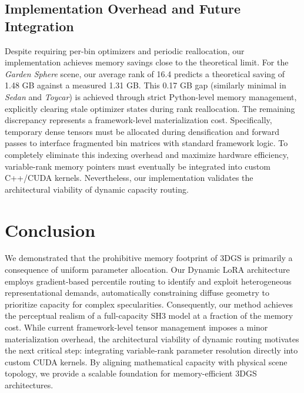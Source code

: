 \documentclass[sigconf]{acmart}
\begin{document}
\subsection{Implementation Overhead and Future Integration}
Despite requiring per-bin optimizers and periodic reallocation, our 
implementation achieves memory savings close to the theoretical limit. For the 
\textit{Garden Sphere} scene, our average rank of 16.4 predicts a theoretical 
saving of 1.48 GB against a measured 1.31 GB. This 0.17 GB gap (similarly 
minimal in \textit{Sedan} and \textit{Toycar}) is achieved through strict 
Python-level memory management, explicitly clearing stale optimizer states 
during rank reallocation. The remaining discrepancy represents a 
framework-level materialization cost. Specifically, temporary dense tensors 
must be allocated during densification and forward passes to interface 
fragmented bin matrices with standard framework logic. To completely 
eliminate this indexing overhead and maximize hardware efficiency, 
variable-rank memory pointers must eventually be integrated into custom 
C++/CUDA kernels. Nevertheless, our implementation validates the architectural 
viability of dynamic capacity routing.
\section{Conclusion}
We demonstrated that the prohibitive memory footprint of 3DGS is primarily a 
consequence of uniform parameter allocation. Our Dynamic LoRA architecture 
employs gradient-based percentile routing to identify and exploit 
heterogeneous representational demands, automatically constraining diffuse 
geometry to prioritize capacity for complex specularities. Consequently, our 
method achieves the perceptual realism of a full-capacity SH3 model at a 
fraction of the memory cost. While current framework-level tensor management 
imposes a minor materialization overhead, the architectural viability of 
dynamic routing motivates the next critical step: integrating variable-rank 
parameter resolution directly into custom CUDA kernels. By aligning mathematical 
capacity with physical scene topology, we provide a scalable foundation for 
memory-efficient 3DGS architectures.



\end{document}
